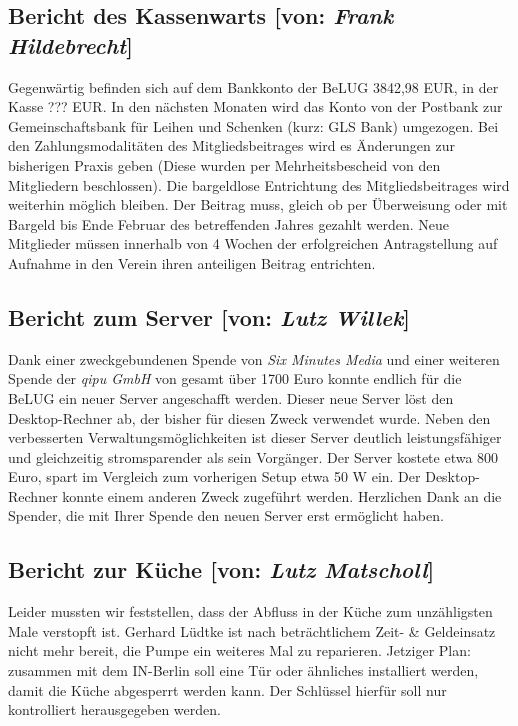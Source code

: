 \documentclass[11pt,a4paper,ngerman]{article}
\begin{document}
  \subsection{Bericht des Kassenwarts [von: 
\textcolor{hellgrau.60}{\textsl{Frank Hildebrecht}}]}

Gegenwärtig befinden sich auf dem Bankkonto der BeLUG 3842,98 EUR, in der Kasse 
??? EUR. In den nächsten Monaten wird das Konto von der Postbank zur 
Gemeinschaftsbank für Leihen und Schenken (kurz: GLS Bank) umgezogen. Bei den 
Zahlungsmodalitäten des Mitgliedsbeitrages wird es Änderungen zur 
bisherigen Praxis geben (Diese wurden per Mehrheitsbescheid von den Mitgliedern 
beschlossen). Die bargeldlose Entrichtung des Mitgliedsbeitrages wird weiterhin 
möglich bleiben. Der Beitrag muss, gleich ob per Überweisung oder mit Bargeld 
bis Ende Februar des betreffenden Jahres gezahlt werden. Neue Mitglieder müssen 
innerhalb von 4 Wochen der erfolgreichen Antragstellung auf Aufnahme in 
den Verein ihren anteiligen Beitrag entrichten.


  \subsection{Bericht zum Server [von: 
\textcolor{hellgrau.60}{\textsl{Lutz Willek}}]}

Dank einer zweckgebundenen Spende von \emph{Six Minutes Media} und einer 
weiteren Spende der \emph{qipu GmbH} von gesamt über 1700 Euro konnte endlich 
für die BeLUG ein neuer Server angeschafft werden. Dieser neue Server löst den 
Desktop-Rechner ab, der bisher für diesen Zweck verwendet wurde. Neben den 
verbesserten Verwaltungsmöglichkeiten ist dieser Server deutlich 
leistungsfähiger und gleichzeitig stromsparender als sein Vorgänger. Der Server 
kostete etwa 800 Euro, spart im Vergleich zum vorherigen Setup etwa 50 W ein. 
Der Desktop-Rechner konnte einem anderen Zweck zugeführt werden. Herzlichen 
Dank an die Spender, die mit Ihrer Spende den neuen Server erst ermöglicht 
haben.


  \subsection{Bericht zur Küche [von: 
\textcolor{hellgrau.60}{\textsl{Lutz Matscholl}}]}

Leider mussten wir feststellen, dass der Abfluss in der Küche zum unzähligsten 
Male verstopft ist. Gerhard Lüdtke ist nach beträchtlichem Zeit- \& Geldeinsatz 
nicht mehr bereit, die Pumpe ein weiteres Mal zu reparieren. Jetziger Plan: 
zusammen mit dem IN-Berlin soll eine Tür oder ähnliches installiert werden, 
damit die Küche abgesperrt werden kann. Der Schlüssel hierfür soll nur 
kontrolliert herausgegeben werden.
\end{document}
